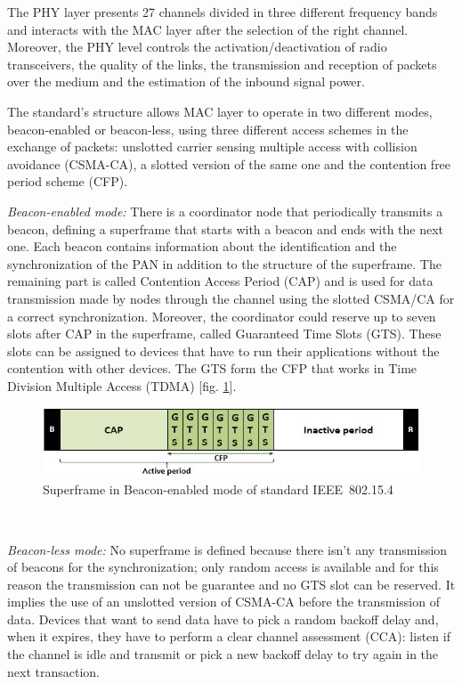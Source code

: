 \documentclass[conference]{IEEEtran}
\begin{document}
The PHY layer presents 27 channels divided in three different frequency bands and interacts with the MAC layer after the selection of the right channel. Moreover, the PHY level controls the activation/deactivation of radio transceivers, the quality of the links, the transmission and reception of packets over the medium and the estimation of the inbound signal power.

The standard's structure allows MAC layer to operate in two different modes, beacon-enabled or beacon-less, using three different access schemes in the exchange of packets: unslotted carrier sensing multiple access with collision avoidance (CSMA-CA), a slotted version of the same one and the contention free period scheme (CFP).
\newline

\textit{Beacon-enabled mode:} There is a coordinator node that periodically transmits a beacon, defining a superframe that starts with a beacon and ends with the next one. Each beacon contains information about the identification and the synchronization of the PAN in addition to the structure of the superframe. The remaining part is called Contention Access Period (CAP) and is used for data transmission made by nodes through the channel using the slotted CSMA/CA for a correct synchronization. Moreover, the coordinator could reserve up to seven slots after CAP in the superframe, called Guaranteed Time Slots (GTS). These slots can be assigned to devices that have to run their applications without the contention with other devices. The GTS form the CFP that works in Time Division Multiple Access (TDMA) [fig. \ref{fig_beaconenabled}].
\newline

\begin{figure}[htbp]
	\centering
	\includegraphics[width=0.9\linewidth]{img/beaconSuperframe.jpg}
	\caption{Superframe in Beacon-enabled mode of standard IEEE~802.15.4}
	\label{fig_beaconenabled}
\end{figure}\



\textit{Beacon-less mode:} No superframe is defined because there isn't any transmission of beacons for the synchronization; only random access is available and for this reason the transmission can not be guarantee and no GTS slot can be reserved. It implies the use of an unslotted version of CSMA-CA before the transmission of data. Devices that want to send data have to pick a random backoff delay and, when it expires, they have to perform a clear channel assessment (CCA): listen if the channel is idle and transmit or pick a new backoff delay to try again in the next transaction. 
\newline
\end{document}

